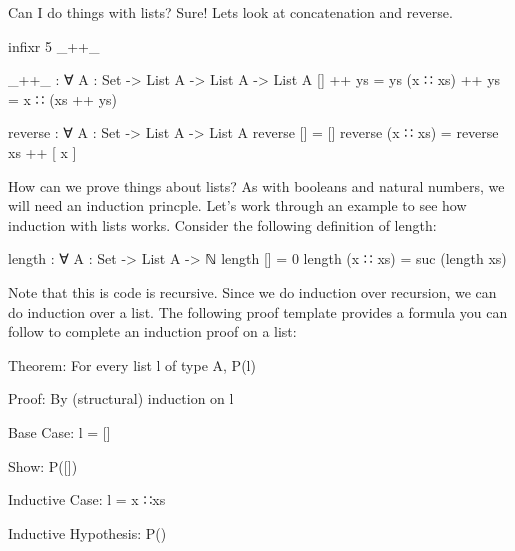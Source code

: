 \documentclass{lecturenotes}
\newcommand{\agdacons}{\textsf{∷}\xspace}
\begin{document}
\vspace{0.2in}

\noindent Can I do things with lists? Sure! Lets look at concatenation and reverse.

\begin{center}
    \begin{code}
        infixr 5 _++_

        _++_ : ∀ {A : Set} -> List A -> List A -> List A
        [] ++ ys = ys 
        (x ∷ xs) ++ ys = x ∷ (xs ++ ys)

        reverse : ∀ {A : Set} -> List A -> List A
        reverse [] = [] 
        reverse (x ∷ xs) = reverse xs ++ [ x ]
    \end{code}
\end{center}

\pagebreak

How can we prove things about lists? 
As with booleans and natural numbers, we will need an induction princple. 
Let's work through an example to see how induction with lists works.
Consider the following definition of length:

\begin{center}
    \begin{code}
        length : ∀ {A : Set} -> List A -> ℕ
        length [] = 0
        length (x ∷ xs) = suc (length xs)
    \end{code}
\end{center}

Note that this is code is recursive.
Since we do induction over recursion, we can do induction over a list. 
The following proof template provides a formula you can follow to complete an induction proof on a list:

\vspace{0.2in}

\noindent Theorem: For every list \textsf{l} of type \textsf{A}, P(\textsf{l})

\noindent Proof: By (structural) induction on \textsf{l} 

\vspace{0.1in}

\noindent Base Case: \textsf{l} = \textsf{[]} 

\noindent Show: P(\textsf{[]}) 

\vspace{0.1in}

\noindent Inductive Case: \textsf{l} = \textsf{x} \agdacons \textsf{xs} 

\noindent Inductive Hypothesis: P() 
\end{document}
